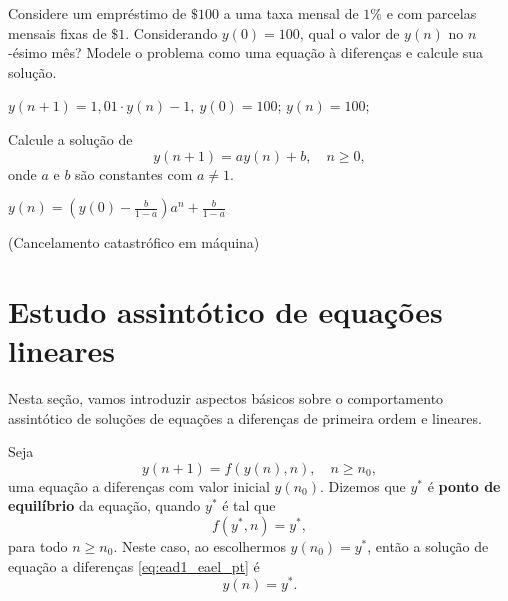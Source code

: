 \begin{exer}
  Considere um empréstimo de $\$ 100$ a uma taxa mensal de $1\%$ e com parcelas mensais fixas de $\$ 1$. Considerando $y(0)=100$, qual o valor de $y(n)$ no $n$-ésimo mês? Modele o problema como uma equação à diferenças e calcule sua solução.
\end{exer}
\begin{resp}
  $y(n+1)=1,01\cdot y(n)-1,~y(0)=100$; $y(n)=100$;
\end{resp}

\begin{exer}
  Calcule a solução de
  \begin{equation}
    y(n+1) = ay(n) + b,\quad n\geq 0,
  \end{equation}
  onde $a$ e $b$ são constantes com $a\neq 1$.
\end{exer}
\begin{resp}
  $\displaystyle y(n) = \left(y(0)-\frac{b}{1-a}\right)a^n + \frac{b}{1-a}$
\end{resp}

\begin{ex}(Cancelamento catastrófico em máquina)
  \emconstrucao
\end{ex}

\section{Estudo assintótico de equações lineares}\label{cap_ead1_sec_eael}

Nesta seção, vamos introduzir aspectos básicos sobre o comportamento assintótico de soluções de equações a diferenças de primeira ordem e lineares.

Seja
\begin{equation}\label{eq:ead1_eael_pt}
  y(n+1) = f(y(n),n),\quad n\geq n_0,
\end{equation}
uma equação a diferenças com valor inicial $y(n_0)$. Dizemos que $y^*$ é {\bf ponto de equilíbrio} da equação, quando $y^*$ é tal que
\begin{equation}\label{eq:ead1_eael_eq}
  f(y^*,n) = y^*,
\end{equation}
para todo $n\geq n_0$.  Neste caso, ao escolhermos $y(n_0)=y^*$, então a solução de equação a diferenças \eqref{eq:ead1_eael_pt} é
\begin{equation}
  y(n) = y^*.
\end{equation}

